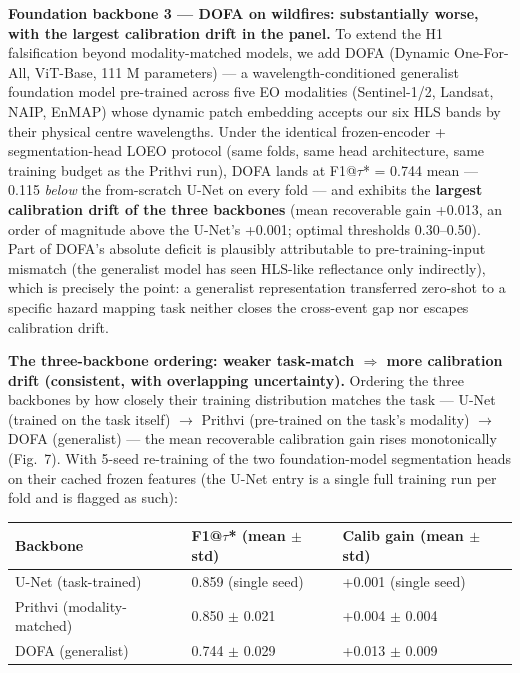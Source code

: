 \documentclass[sn-nature,lineno]{sn-jnl}
\theoremstyle{thmstyleone}
\theoremstyle{thmstyletwo}
\theoremstyle{thmstylethree}
\begin{document}
\textbf{Foundation backbone 3 --- DOFA on wildfires: substantially worse, with
the largest calibration drift in the panel.} To extend the H1
falsification beyond modality-matched models, we add DOFA (Dynamic
One-For-All, ViT-Base, 111 M parameters) --- a wavelength-conditioned
generalist foundation model pre-trained across five EO modalities
(Sentinel-1/2, Landsat, NAIP, EnMAP) whose dynamic patch embedding
accepts our six HLS bands by their physical centre wavelengths. Under
the identical frozen-encoder + segmentation-head LOEO protocol (same
folds, same head architecture, same training budget as the Prithvi
run), DOFA lands at F1@$\tau$* = 0.744 mean --- 0.115 \emph{below} the
from-scratch U-Net on every fold --- and exhibits the \textbf{largest
calibration drift of the three backbones} (mean recoverable gain
+0.013, an order of magnitude above the U-Net's +0.001; optimal
thresholds 0.30--0.50). Part of DOFA's absolute deficit is plausibly
attributable to pre-training-input mismatch (the generalist model has
seen HLS-like reflectance only indirectly), which is precisely the
point: a generalist representation transferred zero-shot to a specific
hazard mapping task neither closes the cross-event gap nor escapes
calibration drift.

\textbf{The three-backbone ordering: weaker task-match $\Rightarrow$ more calibration
drift (consistent, with overlapping uncertainty).} Ordering the three
backbones by how closely their training distribution matches the task ---
U-Net (trained on the task itself) $\rightarrow$ Prithvi (pre-trained on the task's
modality) $\rightarrow$ DOFA (generalist) --- the mean recoverable calibration gain
rises monotonically (Fig.~7). With 5-seed re-training of the two foundation-model
segmentation heads on their cached frozen features (the U-Net entry is
a single full training run per fold and is flagged as such):

\begin{longtable}[]{@{}lll@{}}
\toprule\noalign{}
Backbone & F1@$\tau$* (mean $\pm$ std) & Calib gain (mean $\pm$ std) \\
\midrule\noalign{}
\endhead
\bottomrule\noalign{}
\endlastfoot
U-Net (task-trained) & 0.859 (single seed) & +0.001 (single seed) \\
Prithvi (modality-matched) & 0.850 $\pm$ 0.021 & +0.004 $\pm$ 0.004 \\
DOFA (generalist) & 0.744 $\pm$ 0.029 & +0.013 $\pm$ 0.009 \\
\end{longtable}
\end{document}

